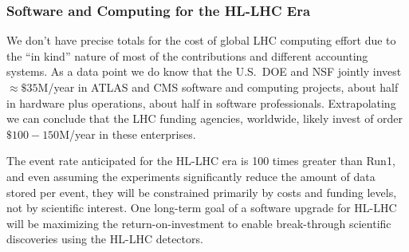 \begin{frame}
\frametitle{Software and Computing for the HL-LHC Era }

We don't have precise totals for the cost of global LHC computing 
effort due to the ``in kind'' nature of most of the contributions and different accounting systems.
As a data point we do know that the U.S.\ DOE and NSF jointly invest 
$ \approx \$ 35 $M/year in
ATLAS and CMS software and computing projects, about half in hardware plus operations,
about half in software professionals.
Extrapolating we can conclude that the LHC funding agencies, worldwide, 
likely invest of order $ \$ 100-150 $M/year in these enterprises.

The event rate anticipated for the HL-LHC era is 100 times greater than Run1,
and even assuming the experiments significantly reduce the
amount of data stored per event,
they will be constrained primarily by costs and funding levels,
not by scientific interest.
One long-term goal of a software upgrade for HL-LHC
will be maximizing the return-on-investment to enable break-through
scientific discoveries using the  HL-LHC detectors.


\end{frame}


